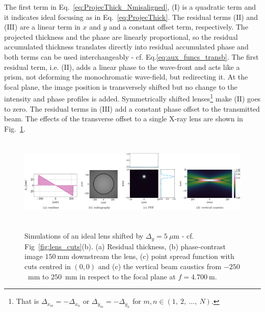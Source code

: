 \begin{refsection}
The first term in Eq.~\ref{eq:ProjecThick_Nmisaligned}, ($\text{I}$) is a quadratic term and it indicates ideal focusing as in Eq.~\ref{eq:ProjecThick}. The residual terms ($\text{II}$) and ($\text{III}$) are a linear term in $x$ and $y$ and a constant offset term, respectively. The projected thickness and the phase are linearly proportional, so the residual accumulated thickness translates directly into residual accumulated phase and both terms can be used interchangeably - cf. Eq.\ref{eq:aux_funcs_transb}. The first residual term, i.e. ($\text{II}$), adds a linear phase to the wave-front and acts like a prism, not deforming the monochromatic wave-field, but redirecting it. At the focal plane, the image position is transversely shifted but no change to the intensity and phase profiles is added. Symmetrically shifted lenses\footnote{That is $\Delta_{x_m}=-\Delta_{x_n}$ or $\Delta_{y_m}=-\Delta_{y_n}$ for $m,n\in(1,~2,~...,~N)$.} make ($\text{II}$) goes to zero. The residual terms in ($\text{III}$) add a constant phase offset to the transmitted beam.  The effects of the transverse offset to a single X-ray lens are shown in Fig.~\ref{fig:shifted_CRL}.
\begin{figure}[t]
        \centering
         {\includegraphics[height=4.19cm]{figures/ch04/shifted_CRL.pdf}}
        \caption[Effects of a transverse CRL offset]{Simulations of an ideal lens shifted by $\Delta_y=5~\mu$m - cf. Fig~\ref{fig:lens_cuts}(b). (a) Residual thickness, (b) phase-contrast image $150~$mm downstream the lens, (c) point spread function with cuts centred in $(0,0)$ and (c) the vertical beam caustics from $-250$~mm to $250$~mm in respect to the focal plane at $f=4.700~$m.} \label{fig:shifted_CRL}
\end{figure}



\end{refsection}
